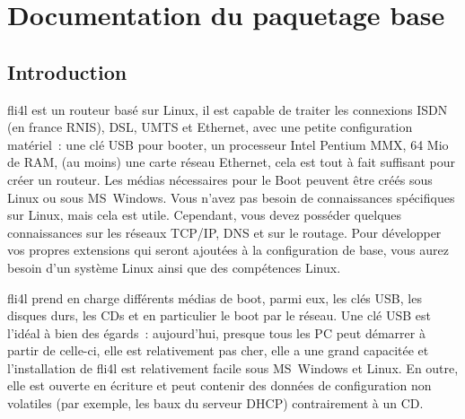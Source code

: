 \chapter{Documentation du paquetage base}

\section{Introduction}

fli4l est un routeur basé sur Linux, il est capable de traiter les connexions
ISDN (en france RNIS), DSL, UMTS et Ethernet, avec une petite configuration
matériel~: une clé USB pour booter, un processeur Intel Pentium MMX, 64 Mio de RAM,
(au moins) une carte réseau Ethernet, cela est tout à fait suffisant pour créer
un routeur. Les médias nécessaires pour le Boot peuvent être créés sous Linux
ou sous MS~Windows. Vous n'avez pas besoin de connaissances spécifiques sur Linux,
mais cela est utile. Cependant, vous devez posséder quelques connaissances sur
les réseaux TCP/IP, DNS et sur le routage. Pour développer vos propres extensions
qui seront ajoutées à la configuration de base, vous aurez besoin d'un système
Linux ainsi que des compétences Linux.

fli4l prend en charge différents médias de boot, parmi eux, les clés USB,
les disques durs, les CDs et en particulier le boot par le réseau. Une clé USB
est l'idéal à bien des égards~: aujourd'hui, presque tous les PC peut démarrer
à partir de celle-ci, elle est relativement pas cher, elle a une grand capacitée
et l'installation de fli4l est relativement facile sous MS~Windows et Linux. En
outre, elle est ouverte en écriture et peut contenir des données de configuration
non volatiles (par exemple, les baux du serveur DHCP) contrairement à un CD.

